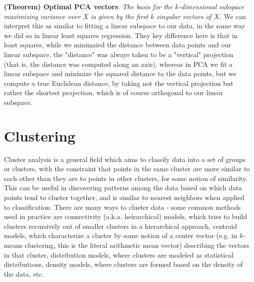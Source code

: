 \documentclass{article}
\begin{document}
\newline \newline
\textbf{(Theorem) Optimal PCA vectors}: \textit{The basis for the $ k $-dimensional subspace maximizing variance over $ X $ is given by the first $ k $ singular vectors of $ X $.}
\newline \newline
We can interpret this as similar to fitting a linear subspace to our data, in the same way we did so in linear least squares regression. They key difference here is that in least squares, while we minimzied the distance between data points and our linear subspace, the "distance" was always taken to be a "vertical" projection (that is, the distance was computed along an axis), whereas in PCA we fit a linear subspace and minimize the squared distance to the data points, but we compute a true Euclidean distance, by taking not the vertical projection but rather the shortest projection, which is of course orthogonal to our linear subspace.

\section{Clustering}
Cluster analysis is a general field which aims to classify data into a set of groups or clusters, with the constraint that points in the same cluster are more similar to each other than they are to points in other clusters, for some notion of similarity. This can be useful in discovering patterns among the data based on which data points tend to cluster together, and is similar to nearest neighbors when applied to classification. There are many ways to cluster data - some common methods used in practice are connectivity (a.k.a. heirarchical) models, which tries to build clusters recursively out of smaller clusters in a hierarchical approach, centroid models, which characterize a cluster by some notion of a center vector (e.g. in $ k $-means clustering, this is the literal arithmetic mean vector) describing the vectors in that cluster, distribution models, where clusters are modeled as statistical distributions, density models, where clusters are formed based on the density of the data, etc.
\end{document}
